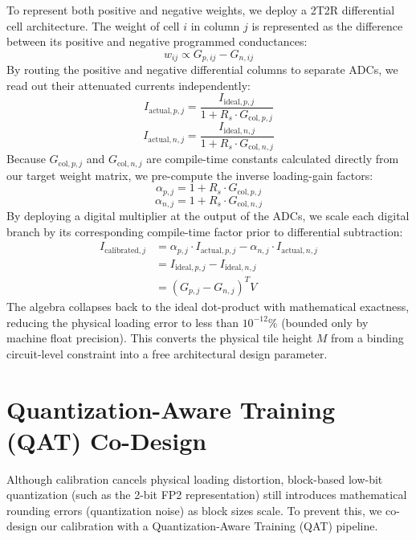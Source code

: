 \documentclass[conference]{IEEEtran}
\begin{document}
To represent both positive and negative weights, we deploy a 2T2R differential cell architecture. The weight of cell $i$ in column $j$ is represented as the difference between its positive and negative programmed conductances:
\begin{equation}
    w_{ij} \propto G_{p, ij} - G_{n, ij}
\end{equation}
By routing the positive and negative differential columns to separate ADCs, we read out their attenuated currents independently:
\begin{equation}
    I_{\text{actual}, p, j} = \frac{I_{\text{ideal}, p, j}}{1 + R_s \cdot G_{\text{col}, p, j}}
\end{equation}
\begin{equation}
    I_{\text{actual}, n, j} = \frac{I_{\text{ideal}, n, j}}{1 + R_s \cdot G_{\text{col}, n, j}}
\end{equation}
Because $G_{\text{col}, p, j}$ and $G_{\text{col}, n, j}$ are compile-time constants calculated directly from our target weight matrix, we pre-compute the inverse loading-gain factors:
\begin{equation}
    \alpha_{p, j} = 1 + R_s \cdot G_{\text{col}, p, j}
\end{equation}
\begin{equation}
    \alpha_{n, j} = 1 + R_s \cdot G_{\text{col}, n, j}
\end{equation}
By deploying a digital multiplier at the output of the ADCs, we scale each digital branch by its corresponding compile-time factor prior to differential subtraction:
\begin{equation}
    \begin{aligned}
        I_{\text{calibrated}, j} &= \alpha_{p, j} \cdot I_{\text{actual}, p, j} - \alpha_{n, j} \cdot I_{\text{actual}, n, j} \\
        &= I_{\text{ideal}, p, j} - I_{\text{ideal}, n, j} \\
        &= (G_{p, j} - G_{n, j})^T V
    \end{aligned}
\end{equation}
The algebra collapses back to the ideal dot-product with mathematical exactness, reducing the physical loading error to less than $10^{-12}\%$ (bounded only by machine float precision). This converts the physical tile height $M$ from a binding circuit-level constraint into a free architectural design parameter.

\section{Quantization-Aware Training (QAT) Co-Design}
Although calibration cancels physical loading distortion, block-based low-bit quantization (such as the 2-bit FP2 representation) still introduces mathematical rounding errors (quantization noise) as block sizes scale. To prevent this, we co-design our calibration with a Quantization-Aware Training (QAT) pipeline.
\end{document}
